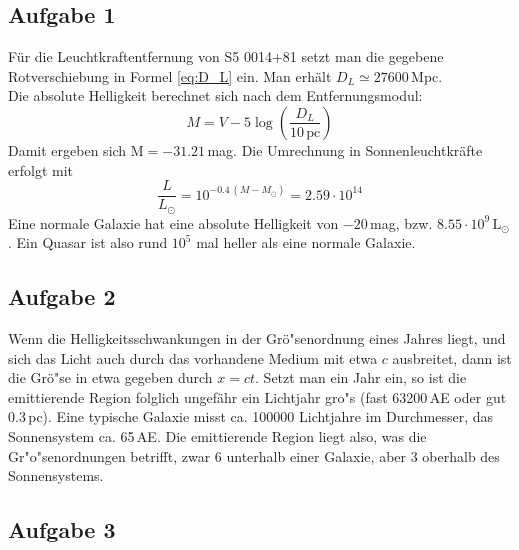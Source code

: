 \documentclass[12pt]{article}
\begin{document}
\subsection{Aufgabe 1}

F\"{u}r die Leuchtkraftentfernung von S5 0014+81 setzt man die gegebene Rotverschiebung in Formel \ref{eq:D_L} ein. Man erh\"{a}lt $D_L\simeq27600\,$Mpc. \\
Die absolute Helligkeit berechnet sich nach dem Entfernungsmodul:
\begin{equation} \label{eq:dist_mod}
	M=V-5 \log\left(\frac{D_L}{10\,\text{pc}}\right)
\end{equation}
Damit ergeben sich $\text{M} = -31.21\,$mag. Die Umrechnung in Sonnenleuchtkr\"{a}fte erfolgt mit
\begin{equation}
	\frac{L}{L_\odot} = 10^{-0.4\,(M-M_\odot)} = 2.59\cdot 10^{14}
\end{equation}
Eine normale Galaxie hat eine absolute Helligkeit von $-20\,$mag, bzw. $8.55\cdot 10^9\,\text{L}_\odot$. Ein Quasar ist also rund $10^5$ mal heller als eine normale Galaxie.
 
\subsection{Aufgabe 2}

Wenn die Helligkeitsschwankungen in der Gr\"{o}"senordnung eines Jahres liegt, und sich das Licht auch durch das vorhandene Medium mit etwa $c$ ausbreitet, dann ist die Gr\"{o}"se in etwa gegeben durch $x = ct$. Setzt man ein Jahr ein, so ist die emittierende Region folglich ungef\"{a}hr ein Lichtjahr gro"s (fast 63200\,AE oder gut 0.3\,pc). Eine typische Galaxie misst ca. 100000 Lichtjahre im Durchmesser, das Sonnensystem ca. 65\,AE. Die emittierende Region liegt also, was die Gr"{o}"senordnungen betrifft, zwar 6 unterhalb einer Galaxie, aber 3 oberhalb des Sonnensystems.

\subsection{Aufgabe 3} \label{a3}
\end{document}
